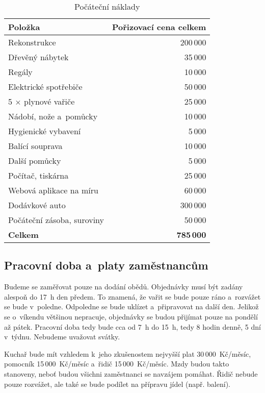 \begin{table}[htbp]
\begin{center}
\begin{tabular}{ l r }

\textbf{Položka}&\textbf{Pořizovací cena celkem} \\ \hline 
Rekonstrukce & 200\,000 \\ 
Dřevěný nábytek & 35\,000 \\ 
Regály & 10\,000 \\ 
Elektrické spotřebiče & 50\,000 \\ 
5 $\times$ plynové vařiče & 25\,000 \\ 
Nádobí, nože a~pomůcky & 10\,000 \\ 
Hygienické vybavení & 5\,000 \\ 
Balící souprava & 10\,000 \\ 
Další pomůcky & 5\,000 \\ 
Počítač, tiskárna & 25\,000 \\ 
Webová aplikace na míru & 60\,000 \\ 
Dodávkové auto & 300\,000 \\ 
Počáteční zásoba, suroviny & 50\,000 \\ \hline 
\textbf{Celkem} & \textbf{785\,000} \\

\end{tabular}
\caption{Počáteční náklady}
\label{pocatecni_naklady}
\end{center}
\end{table}

\subsection{Pracovní doba a~platy zaměstnancům}
Budeme se zaměřovat pouze na dodání obědů. Objednávky musí být zadány alespoň do 17~h den předem. To znamená, že vařit se bude pouze ráno a~rozvážet se bude v~poledne. Odpoledne se bude uklízet a~připravovat na další den. Jelikož se o~víkendu většinou nepracuje, objednávky se budou přijímat pouze na pondělí až pátek. Pracovní doba tedy bude cca od 7~h do 15~h, tedy 8 hodin denně, 5 dní v~týdnu. Nebudeme uvažovat svátky.

Kuchař bude mít vzhledem k~jeho zkušenostem nejvyšší plat 30\,000~Kč/měsíc, pomocník 15\,000~Kč/měsíc a~řidič 15\,000~Kč/měsíc. Mzdy budou takto stanoveny, neboť budou všichni zaměstnanci se navzájem pomáhat. Řidič nebude pouze rozvážet, ale také se bude podílet na přípravu jídel (např. balení).





